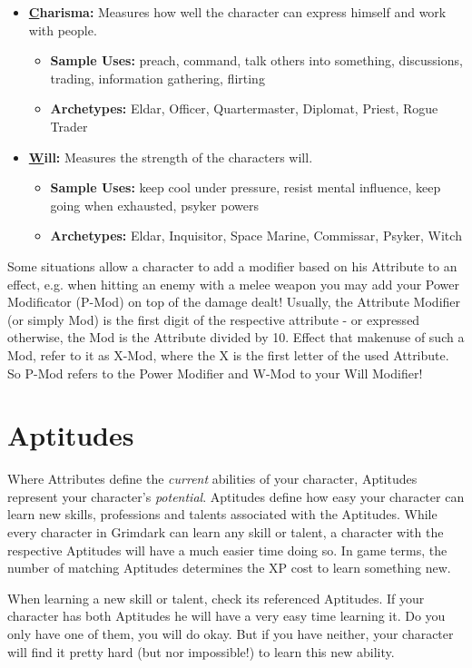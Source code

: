 \begin{itemize}
	\item {\large\textbf{\underline{C}harisma:}} Measures how well the character can express himself and work with people.
	\begin{itemize}
		\item \textbf{Sample Uses:} preach, command, talk others into something, discussions, trading, information gathering, flirting
		\item \textbf{Archetypes:} Eldar, Officer, Quartermaster, Diplomat, Priest, Rogue Trader
	\end{itemize}

	\item {\large\textbf{\underline{W}ill:}} Measures the strength of the characters will.
	\begin{itemize}
		\item \textbf{Sample Uses:} keep cool under pressure, resist mental influence, keep going when exhausted, psyker powers
		\item \textbf{Archetypes:} Eldar, Inquisitor, Space Marine, Commissar, Psyker, Witch
	\end{itemize}
\end{itemize}


Some situations allow a character to add a modifier based on his Attribute to an effect, e.g. when hitting an enemy with a melee weapon you may add your Power Modificator (P-Mod) on top of the damage dealt!
Usually, the Attribute Modifier (or simply Mod) is the first digit of the respective attribute - or expressed otherwise, the Mod is the Attribute divided by 10.
Effect that makenuse of such a Mod, refer to it as X-Mod, where the X is the first letter of the used Attribute.
So P-Mod refers to the Power Modifier and W-Mod to your Will Modifier!

\section{Aptitudes}\label{Aptitudes}
Where Attributes define the \textit{current} abilities of your character, Aptitudes represent your character's \textit{potential}.
Aptitudes define how easy your character can learn new skills, professions and talents associated with the Aptitudes.
While every character in Grimdark can learn any skill or talent, a character with the respective Aptitudes will have a much easier time doing so.
In game terms, the number of matching Aptitudes determines the XP cost to learn something new.

When learning a new skill or talent, check its referenced Aptitudes. 
If your character has both Aptitudes he will have a very easy time learning it.
Do you only have one of them, you will do okay.
But if you have neither, your character will find it pretty hard (but nor impossible!) to learn this new ability.

